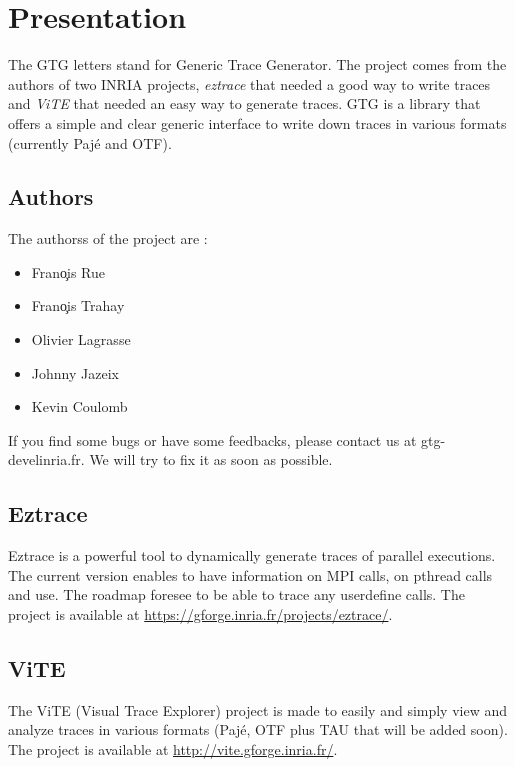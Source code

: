 \section{Presentation}
The GTG letters stand for Generic Trace Generator. The project comes from the 
authors of two INRIA projects, \textit{eztrace} that needed a good way to 
write traces and \textit{ViTE} that needed an easy way to generate traces. GTG
is a library that offers a simple and clear generic interface to write down
traces in various formats (currently Paj\'e and OTF).

\subsection{Authors}
The authorss of the project are :
\begin{itemize}
\item Fran\c ois Rue
\item Fran\c ois Trahay
\item Olivier Lagrasse
\item Johnny Jazeix
\item Kevin Coulomb
\end{itemize}
If you find some bugs or have some feedbacks, please contact us at
gtg-devel\@ inria.fr. We will try to fix it as soon as possible.

\subsection{Eztrace}
Eztrace is a powerful tool to dynamically generate traces of parallel 
executions. The current version enables to have information on MPI calls, on
pthread calls and use. The roadmap foresee to be able to trace any userdefine 
calls. The project is available at 
\url{https://gforge.inria.fr/projects/eztrace/}.

\subsection{ViTE}
The ViTE (Visual Trace Explorer) project is made to easily and simply view and 
analyze traces in various formats (Paj\'e, OTF plus TAU that will be added 
soon). The project is available at \url{http://vite.gforge.inria.fr/}.

